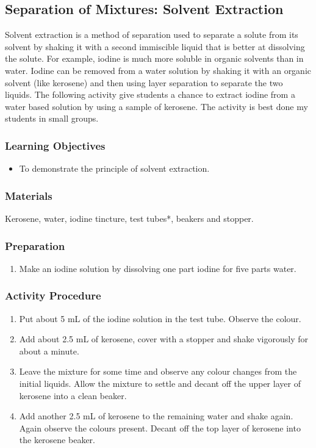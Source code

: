 \subsection{Separation of Mixtures: Solvent Extraction}

Solvent extraction is a method of separation used to separate a solute from its solvent by shaking it with a second immiscible liquid that is better at dissolving the solute. For example, iodine is much more soluble in organic solvents than in water. Iodine can be removed from a water solution by shaking it with an organic solvent (like kerosene) and then using layer separation to separate the two liquids.
The following activity give students a chance to extract iodine from a water based solution by using a sample of kerosene. The activity is best done my students in small groups.

\subsubsection*{Learning Objectives}
\begin{itemize}
\item{To demonstrate the principle of solvent extraction.}
\end{itemize}

\subsubsection*{Materials}
Kerosene, water, iodine tincture, test tubes*, beakers and stopper.

\subsubsection*{Preparation}
\begin{enumerate}
\item{Make an iodine solution by dissolving one part iodine for five parts water.}
\end{enumerate}

\subsubsection*{Activity Procedure}
\begin{enumerate}
\item{Put about 5 mL of the iodine solution in the test tube. Observe the colour.}
\item{Add about 2.5 mL of kerosene, cover with a stopper and shake vigorously for about a minute.}
\item{Leave the mixture for some time and observe any colour changes from the initial liquids. Allow the mixture to settle and decant off the upper layer of kerosene into a clean beaker.}
\item{Add another 2.5 mL of kerosene to the remaining water and shake again. Again observe the colours present. Decant off the top layer of kerosene into the kerosene beaker.}
\end{enumerate}

